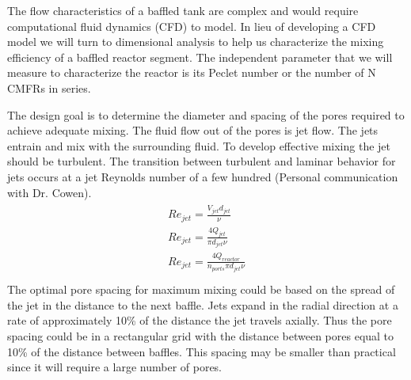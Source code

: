 \documentclass[letterpaper,10pt,english]{sphinxmanual}
\begin{document}
The flow characteristics of a baffled tank are complex and would require computational fluid dynamics (CFD) to model. In lieu of developing a CFD model we will turn to dimensional analysis to help us characterize the mixing efficiency of a baffled reactor segment. The independent parameter that we will measure to characterize the reactor is its Peclet number or the number of N CMFRs in series.

The design goal is to determine the diameter and spacing of the pores required to achieve adequate mixing. The fluid flow out of the pores is jet flow. The jets entrain and mix with the surrounding fluid. To develop effective mixing the jet should be turbulent. The transition between turbulent and laminar behavior for jets occurs at a jet Reynolds number of a few hundred (Personal communication with Dr. Cowen).
\begin{align}\label{equation:Reactor_Characteristics/Reactor_Characteristics:Reactor_Characteristics/Reactor_Characteristics:14}\!\begin{aligned}
Re_{jet} =\frac{V_{jet} d_{jet} }{\nu }\\
Re_{jet} =\frac{4Q_{jet} }{\pi d_{jet} \nu }\\
Re_{jet} =\frac{4Q_{reactor} }{n_{ports} \pi d_{jet} \nu }\\
\end{aligned}\end{align}
The optimal pore spacing for maximum mixing could be based on the spread of the jet in the distance to the next baffle.  Jets expand in the radial direction at a rate of approximately 10\% of the distance the jet travels axially. Thus the pore spacing could be in a rectangular grid with the distance between pores equal to 10\% of the distance between baffles. This spacing may be smaller than practical since it will require a large number of pores.
\end{document}
